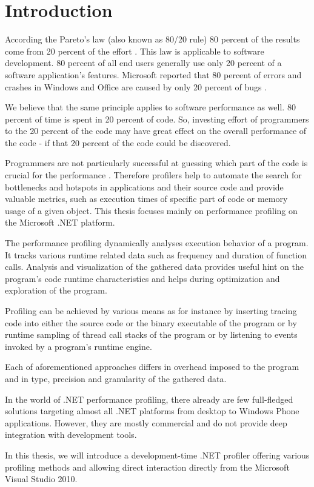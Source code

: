 \chapter{Introduction}

According the Pareto's law (also known as 80/20 rule) 80 percent of the results come from 20 percent of the effort \cite{RicKoch1999}. This law is applicable to software development. 80 percent of all end users generally use only 20 percent of a software application's features. Microsoft reported that 80 percent of errors and crashes in Windows and Office are caused by only 20 percent of bugs \cite{PauRoon2002}.

We believe that the same principle applies to software performance as well. 80 percent of time is spent in 20 percent of code.  So, investing effort of programmers to the 20 percent of the code may have great effect on the overall performance of the code - if that 20 percent of the code could be discovered.

Programmers are not particularly successful at guessing which part of the code is crucial for the performance \cite{SteMcCo2004}. Therefore profilers help to automate the search for bottlenecks and hotspots in applications and their source code and provide valuable metrics, such as execution times of specific part of code or memory usage of a given object. This thesis focuses mainly on performance profiling on the Microsoft .NET platform.

The performance profiling dynamically analyses execution behavior  of a program. It tracks various runtime related data such as frequency and duration of function calls. Analysis and visualization of the gathered data provides useful hint on the program's code runtime characteristics and helps during optimization and exploration of the program.
	
Profiling can be achieved by various means as for instance by inserting tracing code into either the source code or the binary executable of the program or by runtime sampling of thread call stacks of the program or by listening to events invoked by a program's runtime engine.

Each of aforementioned approaches differs in overhead imposed to the program and in type, precision and granularity of the gathered data.

In the world of .NET performance profiling, there already are few full-fledged solutions targeting almost all .NET platforms from desktop to Windows Phone applications. However, they are mostly commercial and do not provide deep integration with development tools.  

In this thesis, we will introduce a development-time .NET profiler offering various profiling methods and allowing direct interaction directly from the Microsoft Visual Studio 2010.